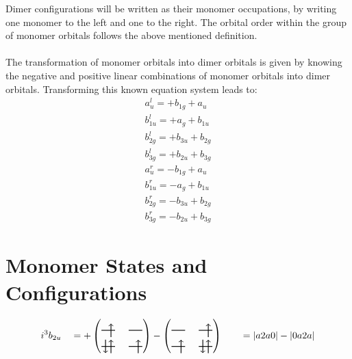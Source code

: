 \documentclass{article}
\begin{document}
Dimer configurations will be written as their monomer occupations, by writing one monomer to the left and one to the right. The orbital order within the group of monomer orbitals follows the above mentioned definition. \\ \\ The transformation of monomer orbitals into dimer orbitals is given by knowing the negative and positive linear combinations of monomer orbitals into dimer orbitals. Transforming this known equation system leads to: 
\begin{subequations}\begin{gather}
a_{u}^{l} = +b_{1g}+a_{u}  \\
b_{1u}^{l} = +a_{g}+b_{1u}  \\
b_{2g}^{l} = +b_{3u}+b_{2g}  \\
b_{3g}^{l} = +b_{2u}+b_{3g}  \\
a_{u}^{r} = -b_{1g}+a_{u}  \\
b_{1u}^{r} = -a_{g}+b_{1u}  \\
b_{2g}^{r} = -b_{3u}+b_{2g}  \\
b_{3g}^{r} = -b_{2u}+b_{3g}\end{gather}\end{subequations}
\newpage

\section{Monomer States and Configurations} 

\[i^3 b_{2u}
\quad = + \left(\begin{tikzpicture}[baseline={(current bounding box.center)}]
    \draw[thick] (0,0) -- (0.5,0); %
    \draw[thick] (1,0) -- (1.5,0); %
    \draw[thick] (0,-0.6) -- (0.5,-0.6); %
    \draw[thick] (1,-0.6) -- (1.5,-0.6); %
\draw[->, thick] (0.35, -0.25) -- (0.35, 0.25); 
\draw[-> , thick] (0.35, -0.85) -- (0.35, -0.35); 
\draw[<- , thick] (0.15, -0.85) -- (0.15, -0.35); 
 \draw[-> , thick] (1.35, -0.85) -- (1.35, -0.35); 
\end{tikzpicture}\right)-\left(\begin{tikzpicture}[baseline={(current bounding box.center)}]
    \draw[thick] (0,0) -- (0.5,0); %
    \draw[thick] (1,0) -- (1.5,0); %
    \draw[thick] (0,-0.6) -- (0.5,-0.6); %
    \draw[thick] (1,-0.6) -- (1.5,-0.6); %
\draw[->, thick] (1.35, -0.25) -- (1.35, 0.25); 
\draw[-> , thick] (0.35, -0.85) -- (0.35, -0.35); 
 \draw[-> , thick] (1.35, -0.85) -- (1.35, -0.35); 
\draw[<- , thick] (1.15, -0.85) -- (1.15, -0.35); 
\end{tikzpicture}\right) \qquad = \left|a2a0\right|-\left|0a2a\right| \]
\end{document}
